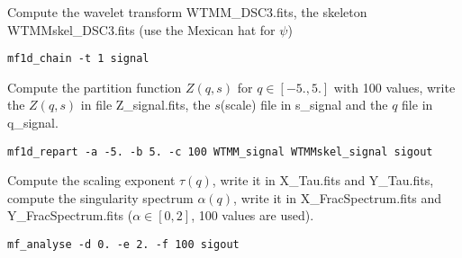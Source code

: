 Compute the wavelet transform WTMM\_DSC3.fits, the skeleton WTMMskel\_DSC3.fits
(use the Mexican hat for $\psi$)
\begin{verbatim}
mf1d_chain -t 1 signal
\end{verbatim}
Compute the partition function $Z(q,s)$ for $q\in[-5.,5.]$ with 100 values,
write the $Z(q,s)$ in file Z\_signal.fits, the $s$(scale) file in s\_signal and the
$q$ file in q\_signal.
\begin{verbatim}
mf1d_repart -a -5. -b 5. -c 100 WTMM_signal WTMMskel_signal sigout
\end{verbatim}
Compute the scaling exponent $\tau(q)$, write it in X\_Tau.fits and Y\_Tau.fits,
compute the singularity spectrum $\alpha(q)$, write it in X\_FracSpectrum.fits
and Y\_FracSpectrum.fits ($\alpha \in [0,2]$, 100 values are used).
\begin{verbatim}
mf_analyse -d 0. -e 2. -f 100 sigout
\end{verbatim}
 





